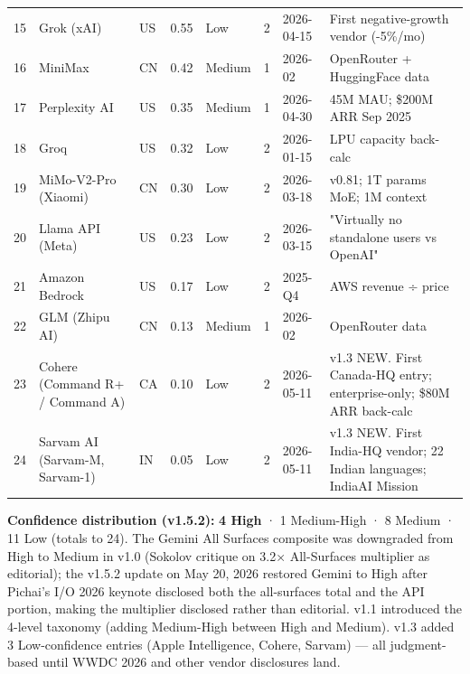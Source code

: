 \documentclass[11pt,a4paper]{article}
\begin{document}
\begin{center}
\begin{tabular}{llllllll}
15 & Grok (xAI) & US & 0.55 & Low & 2 & 2026-04-15 & First negative-growth vendor (-5\%/mo) \\
16 & MiniMax & CN & 0.42 & Medium & 1 & 2026-02 & OpenRouter + HuggingFace data \\
17 & Perplexity AI & US & 0.35 & Medium & 1 & 2026-04-30 & 45M MAU; \$200M ARR Sep 2025 \\
18 & Groq & US & 0.32 & Low & 2 & 2026-01-15 & LPU capacity back-calc \\
19 & MiMo-V2-Pro (Xiaomi) & CN & 0.30 & Low & 2 & 2026-03-18 & v0.81; 1T params MoE; 1M context \\
20 & Llama API (Meta) & US & 0.23 & Low & 2 & 2026-03-15 & "Virtually no standalone users vs OpenAI" \\
21 & Amazon Bedrock & US & 0.17 & Low & 2 & 2025-Q4 & AWS revenue ÷ price \\
22 & GLM (Zhipu AI) & CN & 0.13 & Medium & 1 & 2026-02 & OpenRouter data \\
23 & Cohere (Command R+ / Command A) & CA & 0.10 & Low & 2 & 2026-05-11 & v1.3 NEW. First Canada-HQ entry; enterprise-only; \$80M ARR back-calc \\
24 & Sarvam AI (Sarvam-M, Sarvam-1) & IN & 0.05 & Low & 2 & 2026-05-11 & v1.3 NEW. First India-HQ vendor; 22 Indian languages; IndiaAI Mission \\
\bottomrule
\end{tabular}
\end{center}


\textbf{Confidence distribution (v1.5.2):} \textbf{4 High} · 1 Medium-High · 8 Medium · 11 Low (totals to 24). The Gemini All Surfaces composite was downgraded from High to Medium in v1.0 (Sokolov critique on 3.2× All-Surfaces multiplier as editorial); the v1.5.2 update on May 20, 2026 restored Gemini to High after Pichai's I/O 2026 keynote \cite{pichai2026io} disclosed both the all-surfaces total and the API portion, making the multiplier disclosed rather than editorial. v1.1 introduced the 4-level taxonomy (adding Medium-High between High and Medium). v1.3 added 3 Low-confidence entries (Apple Intelligence, Cohere, Sarvam) --- all judgment-based until WWDC 2026 and other vendor disclosures land.
\end{document}
